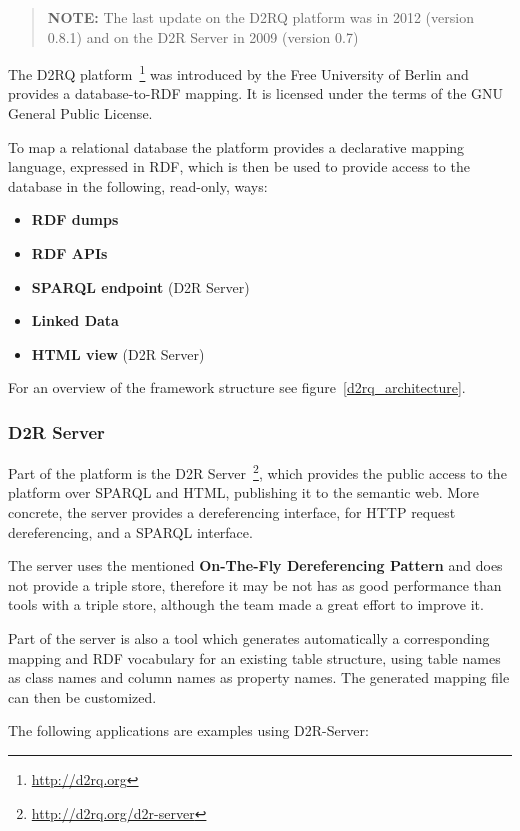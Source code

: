 \begin{verse}
\textbf{NOTE:} The last update on the D2RQ platform was in 2012 (version 0.8.1) and on the D2R Server in 2009 (version 0.7)
\end{verse}

The D2RQ platform~\footnote{\url{http://d2rq.org}} was introduced by the Free University of Berlin and provides a database-to-RDF mapping. It is licensed under the terms of the GNU General Public License. 

To map a relational database the platform provides a declarative mapping language, expressed in RDF, which is then be used to provide access to the database in the following, read-only, ways:~\cite{d2rq_w3c}

\begin{itemize}
\item \textbf{RDF dumps}
\item \textbf{RDF APIs}
\item \textbf{SPARQL endpoint} (D2R Server)
\item \textbf{Linked Data}
\item \textbf{HTML view} (D2R Server)
\end{itemize}

For an overview of the framework structure see figure~\ref{d2rq_architecture}.

\subsubsection{D2R Server}
Part of the platform is the D2R Server~\footnote{\url{http://d2rq.org/d2r-server}}, which provides the public access to the platform over SPARQL and HTML, publishing it to the semantic web. More concrete, the server provides a dereferencing interface, for HTTP request dereferencing, and a SPARQL interface. 

The server uses the mentioned \textbf{On-The-Fly Dereferencing Pattern} and does not provide a triple store, therefore it may be not has as good performance than tools with a triple store, although the team made a great effort to improve it.

Part of the server is also a tool which generates automatically a corresponding mapping and RDF vocabulary for an existing table structure, using table names as class names and column names as property names. The generated mapping file can then be customized.~\cite{bizer2006d2r}

The following applications are examples using D2R-Server:

